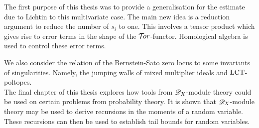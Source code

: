 The first purpose of this thesis was to provide a generalisation for the estimate due to Lichtin to this multivariate case.
The main new idea is a reduction argument to reduce the number of $s_i$ to one.
This involves a tensor product which gives rise to error terms in the shape of the $\mathcal{T}\mkern -3mu or$-functor.
Homological algebra is used to control these error terms.

We also consider the relation of the Bernstein-Sato zero locus to some invariants of singularities.
Namely, the jumping walls of mixed multiplier ideals and $\operatorname{LCT}$-poltopes. \\

\noindent
The final chapter of this thesis explores how tools from $\mathscr{D}_X$-module theory could be used on certain problems from probability theory.
It is shown that $\mathscr{D}_X$-module theory may be used to derive recursions in the moments of a random variable.
These recursions can then be used to establish tail bounds for random variables.
